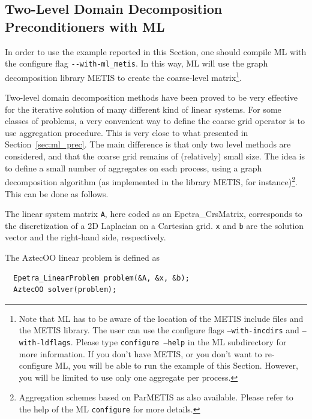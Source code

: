 

\subsection{Two-Level Domain Decomposition Preconditioners with ML}
\label{sec:ml_DD}

In order to use the example reported in this Section, one should compile
ML with the configure flag \verb!--with-ml_metis!. In this way, ML will
use the graph decomposition library METIS to create the coarse-level
matrix\footnote{Note that ML has to be aware of the location of the
  METIS include files and the METIS library. The user can use the
  configure flags {\tt --with-incdirs} and {\tt --with-ldflags}.  Please
  type {\tt configure --help} in the ML subdirectory for more
  information. If you don't have METIS, or you don't want to
  re-configure ML, you will be able to run the example of this Section.
  However, you will be limited to use only one aggregate per process.}.

Two-level domain decomposition methods have been proved to be very
effective for the iterative solution of many different kind of linear
systems.  For some classes of problems, a very convenient way to define
the coarse grid operator is to use aggregation procedure. This is very
close to what presented in Section~\ref{sec:ml_prec}. The main
difference is that only two level methods are considered, and that the
coarse grid remains of (relatively) small size. The idea is to define a
small number of aggregates on each process, using a graph decomposition
algorithm (as implemented in the library METIS, for
instance)\footnote{Aggregation schemes based on ParMETIS as also
  available. Please refer to the help of the ML {\tt configure} for more
  details.}. This can be done as follows.

The linear system matrix \verb!A!, here coded as an Epetra\_CrsMatrix,
corresponds to the discretization of a 2D Laplacian on a Cartesian
grid. \verb!x! and \verb!b! are the solution vector and the right-hand
side, respectively.

The AztecOO linear problem is defined as
\begin{verbatim}
  Epetra_LinearProblem problem(&A, &x, &b);
  AztecOO solver(problem);
\end{verbatim}

